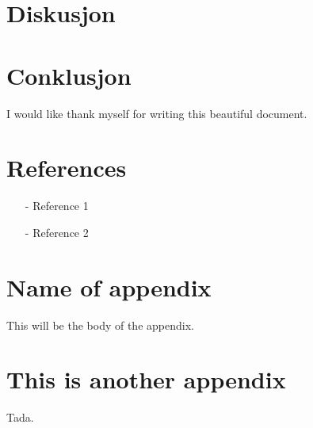 \documentclass[reprint,english,notitlepage]{revtex4-1}  %
\begin{document}
\section{Diskusjon}
\section{Conklusjon}
\begin{acknowledgments}  %
I would like thank myself for writing this beautiful document.
\end{acknowledgments}


\section*{References}  %
\begin{itemize}
\item[-]Reference 1
\item[-]Reference 2
\end{itemize}

\newpage
\appendix
\section{Name of appendix}
This will be the body of the appendix.
\section{This is another appendix}\label{appendix}
Tada.

\end{document}
